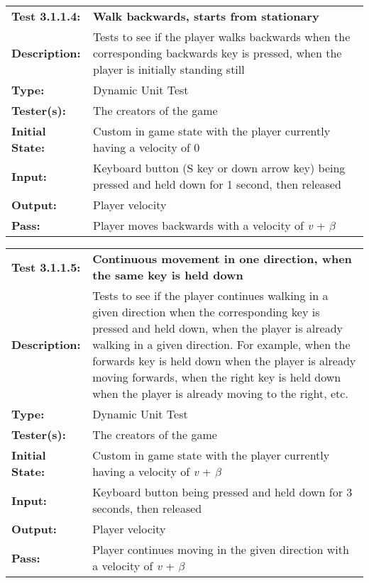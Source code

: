 \documentclass[12pt, titlepage]{article}
\begin{document}
\begin{mdframed}[linewidth=1pt]
\begin{tabularx}{\textwidth}{@{}p{3cm}X@{}}
{\bf Test 3.1.1.4:} & {\bf Walk backwards, starts from stationary}\\[\baselineskip]
{\bf Description:} & Tests to see if the player walks backwards when the corresponding backwards key is pressed, when the player is initially standing still\\[0.5\baselineskip]
{\bf Type:} & Dynamic Unit Test\\[0.5\baselineskip]
{\bf Tester(s):} & The creators of the game\\[0.5\baselineskip]
{\bf Initial State:} & Custom in game state with the player currently having a velocity of 0\\[0.5\baselineskip]
{\bf Input:} & Keyboard button (S key or down arrow key) being pressed and held down for 1 second, then released\\[0.5\baselineskip]
{\bf Output:} & Player velocity\\[0.5\baselineskip]
{\bf Pass:} & Player moves backwards with a velocity of \textit{v} + $\beta$
\end{tabularx}
\end{mdframed}

\begin{mdframed}[linewidth=1pt]
\begin{tabularx}{\textwidth}{@{}p{3cm}X@{}}
{\bf Test 3.1.1.5:} & {\bf Continuous movement in one direction, when the same key is held down}\\[\baselineskip]
{\bf Description:} & Tests to see if the player continues walking in a given direction when the corresponding key is pressed and held down, when the player is already walking in a given direction. For example, when the forwards key is held down when the player is already moving forwards, when the right key is held down when the player is already moving to the right, etc.\\[0.5\baselineskip]
{\bf Type:} & Dynamic Unit Test\\[0.5\baselineskip]
{\bf Tester(s):} & The creators of the game\\[0.5\baselineskip]
{\bf Initial State:} & Custom in game state with the player currently having a velocity of \textit{v} + $\beta$ \\[0.5\baselineskip]
{\bf Input:} & Keyboard button being pressed and held down for 3 seconds, then released\\[0.5\baselineskip]
{\bf Output:} & Player velocity\\[0.5\baselineskip]
{\bf Pass:} & Player continues moving in the given direction with a velocity of \textit{v} + $\beta$
\end{tabularx}
\end{mdframed}
\end{document}
